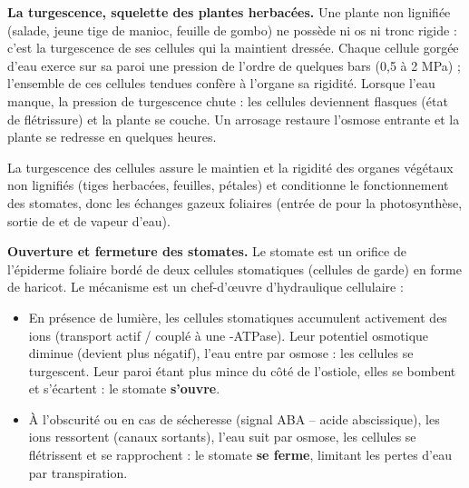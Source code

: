 \documentclass[11pt]{article}
\newcommand{\cle}[1]{{\popxbold\color{popdark}#1}}
\begin{document}
\textbf{La turgescence, squelette des plantes herbacées.} Une plante non lignifiée (salade, jeune tige de manioc, feuille de gombo) ne possède ni os ni tronc rigide : c'est la \cle{turgescence} de ses cellules qui la maintient dressée. Chaque cellule gorgée d'eau exerce sur sa paroi une pression de l'ordre de quelques bars (0,5 à 2 MPa) ; l'ensemble de ces cellules tendues confère à l'organe sa rigidité. Lorsque l'eau manque, la pression de turgescence chute : les cellules deviennent flasques (état de \cle{flétrissure}) et la plante se couche. Un arrosage restaure l'osmose entrante et la plante se redresse en quelques heures.

\begin{propriete}
La turgescence des cellules assure le maintien et la rigidité des organes végétaux non lignifiés (tiges herbacées, feuilles, pétales) et conditionne le fonctionnement des stomates, donc les échanges gazeux foliaires (entrée de  pour la photosynthèse, sortie de  et de vapeur d'eau).
\end{propriete}

\textbf{Ouverture et fermeture des stomates.} Le stomate est un orifice de l'épiderme foliaire bordé de deux \cle{cellules stomatiques} (cellules de garde) en forme de haricot. Le mécanisme est un chef-d'œuvre d'hydraulique cellulaire :
\begin{itemize}
\item En présence de lumière, les cellules stomatiques accumulent activement des ions  (transport actif / couplé à une -ATPase). Leur potentiel osmotique diminue (devient plus négatif), l'eau entre par osmose : les cellules se \cle{turgescent}. Leur paroi étant plus mince du côté de l'ostiole, elles se bombent et s'écartent : le stomate \textbf{s'ouvre}.
\item À l'obscurité ou en cas de sécheresse (signal \cle{ABA} -- acide abscissique), les ions  ressortent (canaux sortants), l'eau suit par osmose, les cellules se \cle{flétrissent} et se rapprochent : le stomate \textbf{se ferme}, limitant les pertes d'eau par transpiration.
\end{itemize}
\end{document}

